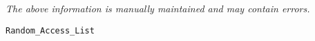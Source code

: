\label{pkg:binary\_random\_access\_list}

{\tiny \it The above information is manually maintained and may contain errors.}
\begin{verbatim}
Random_Access_List
\end{verbatim}
